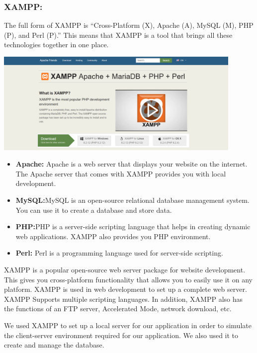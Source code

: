 \documentclass{article}
\begin{document}
\subsubsection*{XAMPP:}
The full form of XAMPP is “Cross-Platform (X), Apache (A), MySQL (M), PHP (P), and Perl (P).” This means that XAMPP is a tool that brings all these technologies together in one place.

\begin{center}
    \includegraphics[width=451px]{media/xampp.png}
\end{center}

\begin{itemize}
    \item \textbf{Apache:} Apache is a web server that displays your website on the internet. The Apache server that comes with XAMPP provides you with local development.
    \item \textbf{MySQL:}\@ MySQL is an open-source relational database management system. You can use it to create a database and store data.
    \item \textbf{PHP:}\@ PHP is a server-side scripting language that helps in creating dynamic web applications. XAMPP also provides you PHP environment.
    \item \textbf{Perl:} Perl is a programming language used for server-side scripting.
\end{itemize}

XAMPP is a popular open-source web server package for website development. This gives you cross-platform functionality that allows you to easily use it on any platform. XAMPP is used in web development to set up a complete web server. XAMPP Supports multiple scripting languages. In addition, XAMPP also has the functions of an FTP server, Accelerated Mode, network download, etc.

We used XAMPP to set up a local server for our application in order to simulate the client-server environment required for our application. We also used it to create and manage the database.
\end{document}
